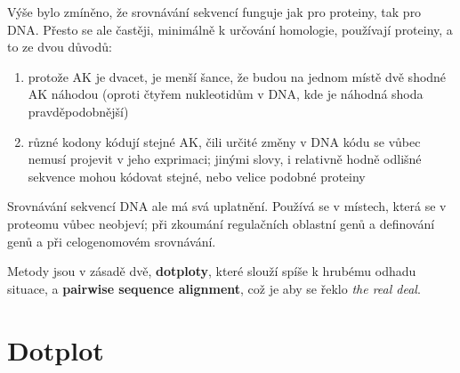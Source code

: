 \documentclass[DIV=8]{scrreprt}
\begin{document}
Výše bylo zmíněno, že srovnávání sekvencí funguje jak pro proteiny, tak pro DNA. Přesto se ale častěji, minimálně k určování homologie, používají proteiny, a to ze dvou důvodů:
\begin{enumerate}[nosep]
    \item protože AK je dvacet, je menší šance, že budou na jednom místě dvě shodné AK náhodou (oproti čtyřem nukleotidům v DNA, kde je náhodná shoda pravděpodobnější)
    \item různé kodony kódují stejné AK, čili určité změny v DNA kódu se vůbec nemusí projevit v jeho exprimaci; jinými slovy, i relativně hodně odlišné sekvence mohou kódovat stejné, nebo velice podobné proteiny
\end{enumerate}



Srovnávání sekvencí DNA ale má svá uplatnění. Používá se v místech, která se v proteomu vůbec neobjeví; při zkoumání regulačních oblastní genů a definování genů a při celogenomovém srovnávání.

Metody jsou v zásadě dvě, \textbf{dotploty}, které slouží spíše k hrubému odhadu situace, a \textbf{pairwise sequence alignment}, což je aby se řeklo \emph{the real deal}.

\section{Dotplot} \label{Dotplot}
\end{document}

